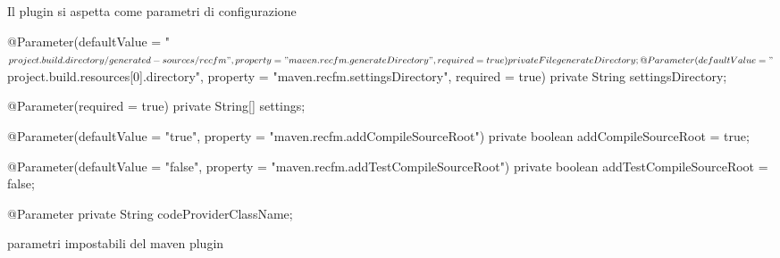 \documentclass[a4paper,10pt]{report}
\newif\ifesource
\newenvironment{elisting}[1][!htb]
  {\captionsetup{aboveskip=0pt}\begin{listing}[#1]}
  {\end{listing}%
}
\begin{document}
Il plugin si aspetta come parametri di configurazione
\ifesource
\begin{figure*}[!htb]
\begin{lstlisting}[language=java, caption=parametri impostabili del maven plugin, 
label=lst:spring-conf]
    @Parameter(defaultValue = "${project.build.directory}/generated-sources/recfm",
        property = "maven.recfm.generateDirectory", required = true)
    private File generateDirectory;

    @Parameter(defaultValue = "${project.build.resources[0].directory}",
        property = "maven.recfm.settingsDirectory", required = true)
    private String settingsDirectory;
    
    @Parameter(required = true)
    private String[] settings;

    @Parameter(defaultValue = "true", property = "maven.recfm.addCompileSourceRoot")
    private boolean addCompileSourceRoot = true;

    @Parameter(defaultValue = "false", property = "maven.recfm.addTestCompileSourceRoot")
    private boolean addTestCompileSourceRoot = false;
    
    @Parameter
    private String codeProviderClassName;
\end{lstlisting}
\end{figure*}
\else
\begin{elisting}
\begin{javacode}
    @Parameter(defaultValue = "${project.build.directory}/generated-sources/recfm",
        property = "maven.recfm.generateDirectory", required = true)
    private File generateDirectory;

    @Parameter(defaultValue = "${project.build.resources[0].directory}",
        property = "maven.recfm.settingsDirectory", required = true)
    private String settingsDirectory;
    
    @Parameter(required = true)
    private String[] settings;

    @Parameter(defaultValue = "true", property = "maven.recfm.addCompileSourceRoot")
    private boolean addCompileSourceRoot = true;

    @Parameter(defaultValue = "false", property = "maven.recfm.addTestCompileSourceRoot")
    private boolean addTestCompileSourceRoot = false;
    
    @Parameter
    private String codeProviderClassName;
\end{javacode}
\caption{parametri impostabili del maven plugin}
\label{lst:spring-conf}
\end{elisting}
\fi
\end{document}

